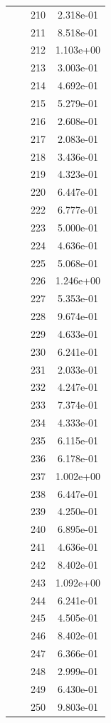 \documentclass[12pt]{article}
\begin{document}
\begin{longtable}{@{}cccc@{}}
 &  & 210 & 2.318e-01 \\
 &  & 211 & 8.518e-01 \\
 &  & 212 & 1.103e+00 \\
 &  & 213 & 3.003e-01 \\
 &  & 214 & 4.692e-01 \\
 &  & 215 & 5.279e-01 \\
 &  & 216 & 2.608e-01 \\
 &  & 217 & 2.083e-01 \\
 &  & 218 & 3.436e-01 \\
 &  & 219 & 4.323e-01 \\
 &  & 220 & 6.447e-01 \\
 &  & 222 & 6.777e-01 \\
 &  & 223 & 5.000e-01 \\
 &  & 224 & 4.636e-01 \\
 &  & 225 & 5.068e-01 \\
 &  & 226 & 1.246e+00 \\
 &  & 227 & 5.353e-01 \\
 &  & 228 & 9.674e-01 \\
 &  & 229 & 4.633e-01 \\
 &  & 230 & 6.241e-01 \\
 &  & 231 & 2.033e-01 \\
 &  & 232 & 4.247e-01 \\
 &  & 233 & 7.374e-01 \\
 &  & 234 & 4.333e-01 \\
 &  & 235 & 6.115e-01 \\
 &  & 236 & 6.178e-01 \\
 &  & 237 & 1.002e+00 \\
 &  & 238 & 6.447e-01 \\
 &  & 239 & 4.250e-01 \\
 &  & 240 & 6.895e-01 \\
 &  & 241 & 4.636e-01 \\
 &  & 242 & 8.402e-01 \\
 &  & 243 & 1.092e+00 \\
 &  & 244 & 6.241e-01 \\
 &  & 245 & 4.505e-01 \\
 &  & 246 & 8.402e-01 \\
 &  & 247 & 6.366e-01 \\
 &  & 248 & 2.999e-01 \\
 &  & 249 & 6.430e-01 \\
 &  & 250 & 9.803e-01 \\

\end{longtable}
\end{document}
